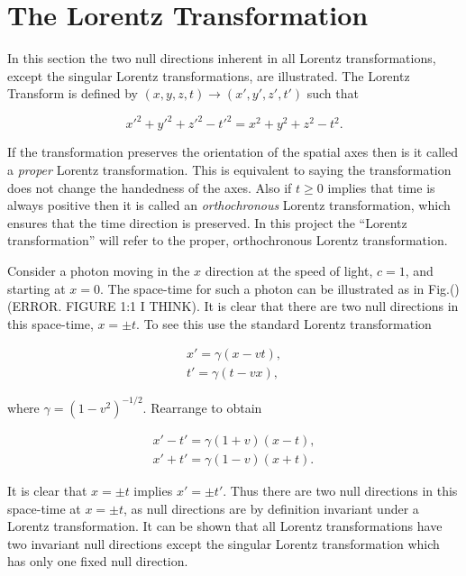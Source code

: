 \section{The Lorentz Transformation}

In this section the two null directions inherent in all Lorentz transformations, except the singular Lorentz transformations, are illustrated. The Lorentz Transform is defined by $(x,y,z,t) \rightarrow (x',y',z',t')$ such that

\begin{equation*}
{x'}^2 + {y'}^2 + {z'}^2 - {t'}^2 = x^2 + y^2 + z^2 - t^2.
\end{equation*}

\noindent If the transformation preserves the orientation of the spatial axes then is it called a \textit{proper} Lorentz transformation. This is equivalent to saying the transformation does not change the handedness of the axes. Also if $t \geq 0$ implies that time is always positive then it is called an \textit{orthochronous} Lorentz transformation, which ensures that the time direction is preserved. In this project the ``Lorentz transformation'' will refer to the proper, orthochronous Lorentz transformation.

Consider a photon moving in the $x$ direction at the speed of light, $c = 1$, and starting at $x = 0$. The space-time for such a photon can be illustrated as in Fig.() (ERROR. FIGURE 1:1 I THINK). It is clear that there are two null directions in this space-time, $x = \pm t$. To see this use the standard Lorentz transformation

\begin{align*}
x'  = \gamma (x - vt),  \\
t'  = \gamma (t - vx),
\end{align*}

\noindent where $\gamma = {(1 - v^2)}^{-1/2}$. Rearrange to obtain

\begin{eqnarray*}
x' - t' = \gamma (1 + v) (x - t), \\
x' + t' = \gamma (1 - v) (x + t).
\end{eqnarray*}

\noindent It is clear that $x = \pm t$ implies $x' = \pm t'$. Thus there are two null directions in this space-time at $x = \pm t$, as null directions are by definition invariant under a Lorentz transformation. It can be shown that all Lorentz transformations have two invariant null directions except the singular Lorentz transformation which has only one fixed null direction.  
